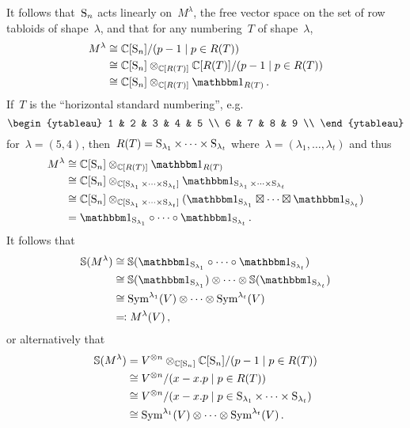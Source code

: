 \documentclass[a4paper,10pt]{scrartcl}
\begin{document}
It follows that~$\operatorname{S}_n$ acts linearly on~$M^\lambda$, the free vector space on the set of row tabloids of shape~$\lambda$, and that for any numbering~$T$ of shape~$\lambda$,
\begin{align*}
  M^\lambda
  &\cong
  \Complex[\symm_n]/(p - 1 \suchthat p \in R(T))
  \\
  &\cong
  \Complex[\symm_n] \tensor_{\Complex[R(T)]} \Complex[R(T)]/(p - 1 \suchthat p \in R(T))
  \\
  &\cong
  \Complex[\symm_n] \tensor_{\Complex[R(T)]} \trivrep_{R(T)} \,.
\end{align*}
If~$T$ is the \enquote{horizontal standard numbering}, e.g.
\[
  \begin{ytableau}
     1 &  2 & 3 & 4 & 5 \\
     6 &  7 & 8 & 9 \\
  \end{ytableau}
\]
for~$\lambda = (5,4)$, then~$R(T) = \operatorname{S}_{\lambda_1} \times \dotsb \times \operatorname{S}_{\lambda_t}$ where~$\lambda = (\lambda_1, \dotsc, \lambda_t)$ and thus
\begin{align*}
  M^\lambda
  &\cong
  \Complex[\symm_n] \tensor_{\Complex[R(T)]} \trivrep_{R(T)}
  \\
  &\cong
  \Complex[\symm_n]
  \tensor_{\Complex[\symm_{\lambda_1} \times \dotsb \times \symm_{\lambda_t}]}
  \trivrep_{\symm_{\lambda_1} \times \dotsb \times \symm_{\lambda_t}}
  \\
  &\cong
  \Complex[\symm_n]
  \tensor_{\Complex[\symm_{\lambda_1} \times \dotsb \times \symm_{\lambda_t}]}
  (\trivrep_{\symm_{\lambda_1}} \outertensor \dotsb \outertensor \trivrep_{\symm_{\lambda_t}})
  \\
  &=
  \trivrep_{\symm_{\lambda_1}} \circ \dotsb \circ \trivrep_{\symm_{\lambda_t}} \,.
\end{align*}
It follows that
\begin{align*}
  \Schur(M^\lambda)
  &\cong
  \Schur(\trivrep_{\symm_{\lambda_1}} \circ \dotsb \circ \trivrep_{\symm_{\lambda_t}})
  \\
  &\cong
  \Schur(\trivrep_{\symm_{\lambda_1}}) \tensor \dotsb \tensor \Schur(\trivrep_{\symm_{\lambda_t}})
  \\
  &\cong
  \Symm^{\lambda_1}(V) \tensor \dotsb \tensor \Symm^{\lambda_t}(V)
  \\
  &\defines
  M^\lambda(V) \,,
\end{align*}
or alternatively that
\begin{align*}
  \Schur(M^\lambda)
  &=
  V^{\tensor n} \tensor_{\Complex[\symm_n]} \Complex[\symm_n]/(p - 1 \suchthat p \in R(T))
  \\
  &\cong
  V^{\tensor n}/(x - x.p \suchthat p \in R(T))
  \\
  &\cong
  V^{\tensor n}/(x - x.p \suchthat p \in \symm_{\lambda_1} \times \dotsb \times \symm_{\lambda_t})
  \\
  &\cong
  \Symm^{\lambda_1}(V) \otimes \dotsb \otimes \Symm^{\lambda_t}(V) \,.
\end{align*}
\end{document}
